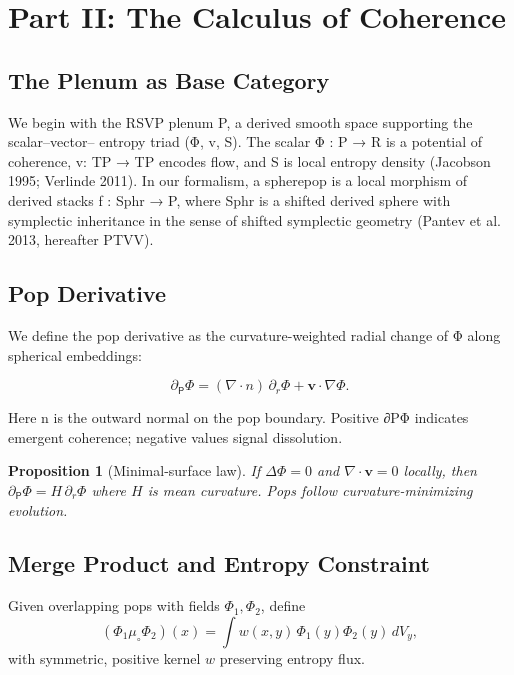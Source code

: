 \documentclass[12pt]{article}
\newtheorem{proposition}{Proposition}
\begin{document}
\section*{Part II: The Calculus of Coherence}

\subsection{The Plenum as Base Category}
We begin with the RSVP plenum P, a derived smooth space supporting the scalar–vector– entropy triad (Φ, v, S). The scalar Φ : P → R is a potential of coherence, v: TP → TP encodes flow, and S is local entropy density (Jacobson 1995; Verlinde 2011). In our formalism, a spherepop is a local morphism of derived stacks f : Sphr → P, where Sphr is a shifted derived sphere with symplectic inheritance in the sense of shifted symplectic geometry (Pantev et al. 2013, hereafter PTVV).

\subsection{Pop Derivative}
We define the pop derivative as the curvature-weighted radial change of Φ along spherical embeddings:

\begin{equation}\label{eq:pop-derivative}
\partial_{\mathsf{P}}\Phi=(\nabla\cdot n)\,\partial_r\Phi + \mathbf{v}\cdot\nabla\Phi.
\end{equation}

Here n is the outward normal on the pop boundary. Positive ∂PΦ indicates emergent coherence; negative values signal dissolution.

\begin{proposition}[Minimal-surface law]
If \(\Delta \Phi=0\) and \(\nabla\cdot\mathbf{v}=0\) locally, then \(\partial_{\mathsf{P}}\Phi = H\,\partial_r\Phi\) where \(H\) is mean curvature. Pops follow curvature-minimizing evolution.
\end{proposition}

\subsection{Merge Product and Entropy Constraint}
Given overlapping pops with fields \(\Phi_1,\Phi_2\), define
\begin{equation}\label{eq:merge}
(\Phi_1\mu_\circ\Phi_2)(x)=\int w(x,y)\,\Phi_1(y)\Phi_2(y)\,dV_y,
\end{equation}
with symmetric, positive kernel \(w\) preserving entropy flux.
\end{document}
